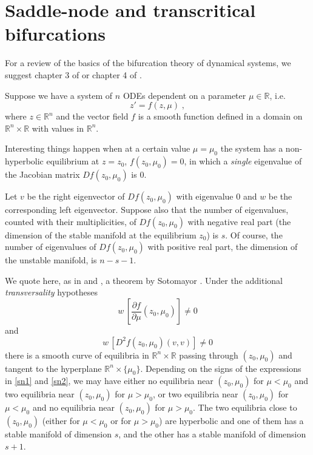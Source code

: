 \documentclass[12pt]{article}
\theoremstyle{definition}
\begin{document}
\section{Saddle-node and transcritical bifurcations} \label{app:sntc}
For a review of the basics of the bifurcation theory of dynamical systems, we suggest chapter 3 of \cite{guckhol} or chapter 4 of \cite{perko}. 

Suppose we have a system of $n$ ODEs dependent on a parameter $\mu \in \mathbb{R}$, i.e.
\[z'=f(z,\mu)\;,\]
where $z\in \mathbb{R}^n$ and the vector field $f$ is a smooth function defined in a domain on $\mathbb{R}^n \times \mathbb{R}$ with values in $\mathbb{R}^n$.

Interesting things happen when at a certain value $\mu=\mu_0$ the system has a non-hyperbolic equilibrium at $z=z_0$, $f(z_0,\mu_0)=0$, in which a \emph{single} eigenvalue of the Jacobian matrix $Df(z_0, \mu_0)$ is 0.

Let $v$ be the right eigenvector of $Df(z_0, \mu_0)$ with eigenvalue 0 and $w$ be the corresponding left eigenvector. Suppose also that the number of eigenvalues, counted with their multiplicities, of $Df(z_0, \mu_0)$ with negative real part (the dimension of the stable manifold at the equilibrium $z_0$) is $s$. Of course, the number of eigenvalues of $Df(z_0, \mu_0)$ with positive real part, the dimension of the unstable manifold, is $n-s-1$.

We quote here, as in \cite{guckhol} and \cite{perko}, a theorem by Sotomayor \cite{sotomayor}. Under the additional \emph{transversality} hypotheses
\begin{equation} \label{sn1}
	w \, [\frac{\partial f}{\partial \mu}(z_0,\mu_0)] \neq 0
\end{equation}
and 
\begin{equation} \label{sn2}
	w \, [D^2f(z_0,\mu_0)(v,v)] \neq 0
\end{equation}
there is a smooth curve of equilibria in $\mathbb{R}^n \times \mathbb{R}$ passing through $(z_0,\mu_0)$ and tangent to the hyperplane $\mathbb{R}^n\times \{\mu_0\}$. Depending on the signs of the expressions in \eqref{sn1} and \eqref{sn2}, we may have either no equilibria near $(z_0,\mu_0)$ for $\mu<\mu_0$ and two equilibria near $(z_0,\mu_0)$ for $\mu>\mu_0$, or two equilibria near $(z_0,\mu_0)$ for $\mu<\mu_0$ and no equilibria near $(z_0,\mu_0)$ for $\mu>\mu_0$. The two equilibria close to $(z_0,\mu_0)$ (either for $\mu<\mu_0$ or for $\mu>\mu_0$) are hyperbolic and one of them has a stable manifold of dimension $s$, and the other has a stable manifold of dimension $s+1$. 
\end{document}
